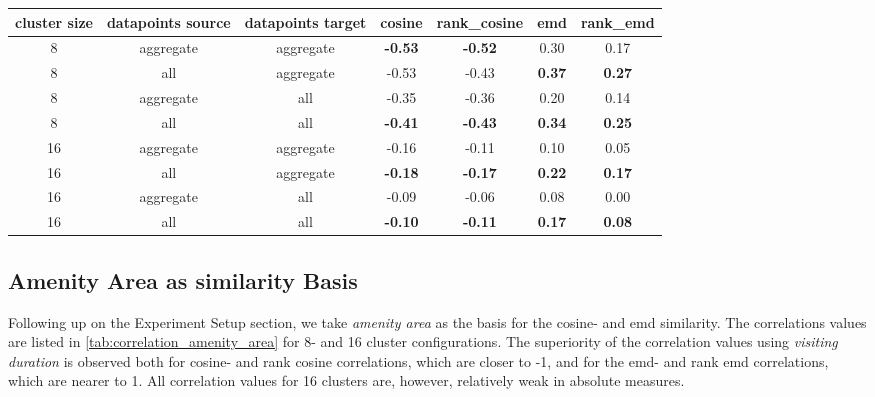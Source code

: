 \documentclass{ws-ijait}
\newcommand{\cmmnt}[1]{\ignorespaces}
\begin{document}
		\begin{table}[!ht]
			{\begin{tabular}{ | c | c | c | c | c | c | c | }
					\hline
					{cluster size} & {datapoints source} & {datapoints target} & cosine & rank\_cosine & emd & rank\_emd \\ \hline
					8	&	aggregate 	&	aggregate 	& 	\textbf{-0.53}	&	\textbf{-0.52}	&	0.30	&	0.17 	\\ \hline
					8	&	all 		&	aggregate 	& 	-0.53	&	-0.43	&	\textbf{0.37}	&	\textbf{0.27}	\\ \hline \hline
					8	&	aggregate 	&	all 		& 	-0.35	&	-0.36	&	0.20	&	0.14	\\ \hline
					8	&	all			& 	all 		&	\textbf{-0.41}	&	\textbf{-0.43}	&	\textbf{0.34}	&	\textbf{0.25}	\\ \hline \hline
					16	&	aggregate	& 	aggregate 	&	-0.16	&	-0.11	&	0.10	&	0.05	\\ \hline
					16	&	all			& 	aggregate 	& 	\textbf{-0.18}	&	\textbf{-0.17}	&	\textbf{0.22}	&	\textbf{0.17}	\\ \hline \hline
					16	&	aggregate	& 	all 		& 	-0.09	&	-0.06	&	0.08	&	0.00	\\ \hline
					16	&	all			&	all 		&	\textbf{-0.10}	&	\textbf{-0.11}	&	\textbf{0.17}	&	\textbf{0.08}	\\ \hline \hline
			\end{tabular}}
			\label{tab:correlation_values}
		\end{table}
							
		\subsection{Amenity Area as similarity Basis}
		Following up on \cmmnt{\cref{experimental_setup:amenity_area}} the Experiment Setup section, we take \textit{amenity area} as the basis for the cosine- and emd similarity. The correlations values are listed in \cref{tab:correlation_amenity_area} for 8- and 16 cluster configurations. The superiority of the correlation values using \textit{visiting duration} is observed both for cosine- and rank cosine correlations, which are closer to -1, and for the emd- and rank emd correlations, which are nearer to 1. All correlation values for 16 clusters are, however, relatively weak in absolute measures.
		
\end{document}
